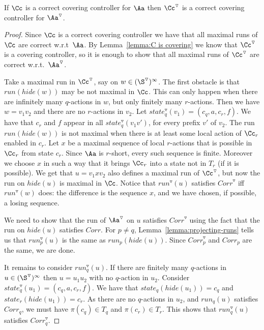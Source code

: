 \documentclass[10pt,a4paper]{article}
\newcommand{\run}{\mathit{run}}
\newcommand{\Cor}{\mathit{Corr}}
\newcommand{\hide}{\mathit{hide}}
\newcommand{\red}[1]{#1^\triangledown}
\newcommand{\state}{\mathit{state}}
\begin{document}
\begin{lemma}\label{lemma:C correct}
  If $\Cc$ is a correct covering controller for $\Aa$ then $\red\Cc$
  is a correct covering controller for $\red\Aa$.
\end{lemma}
\begin{proof}
  Since $\Cc$ is a correct covering controller we have that
  all maximal runs of $\Cc$ are correct w.r.t~$\Aa$.  By
  Lemma~\ref{lemma:C is covering} we 
  know that $\red \Cc$ is a covering controller,
  so it is enough to show that all maximal runs of $\red\Cc$ are
  correct w.r.t.~$\red\Aa$.

  Take a maximal run in $\red\Cc$, say on $w\in (\red\S)^\infty$. The
  first obstacle is that $\run(\hide(w))$ may be not maximal in
  $\Cc$. This can only happen when there are infinitely many
  $q$-actions in $w$, but only finitely many $r$-actions. Then we have
  $w=v_1v_2$ and there are no $r$-actions in $v_2$. Let
  $\red\state_q(v_1)=(c_q,a,c_r,f)$. We have that $c_r$ and $f$ appear
  in all $\red\state_q(v_1v')$, for every prefix $v'$ of $v_2$. The
  run $\run(\hide(w))$ is not maximal when there is at least some
  local action of $\Cc_r$ enabled in $c_r$. Let $x$ be a maximal
  sequence of local $r$-actions that is possible in $\Cc_r$ from state
  $c_r$. Since $\Aa$ is $r$-short, every such sequence is
  finite. Moreover we choose $x$ in such a way that it brings $\Cc_r$
  into a state not in $T_r$ (if it is possible).  We get that
  $u=v_1xv_2$ also defines a maximal run of $\red\Cc$, but now the run
  on $\hide(u)$ is maximal in $\Cc$. Notice that $\red\run(u)$
  satisfies $\red\Cor$ iff $\red\run(w)$ does: the difference is the
  sequence $x$, and we have chosen, if possible, a losing sequence.

  We need to show that the run of $\red\Aa$ on $u$ satisfies
  $\red\Cor$ using the fact that the run on $\hide(u)$ satisfies
  $\Cor$.  For $p\not=q$, Lemma~\ref{lemma:projecting-runs} tells us
  that $\red\run_p(u)$ is the same as $\run_p(\hide(u))$. Since
  $\red\Cor_p$ and $\Cor_p$ are the same, we are done.

  It remains to consider $\red\run_q(u)$. If there are finitely many
  $q$-actions  in $u \in (\red\S)^\infty$ then  $u=u_1u_2$ with no
  $q$-action in $u_2$. Consider
  $\red\state_q(u_1)=(c_q,a,c_r,f)$. We have that
  $\state_q(\hide(u_1))=c_q$ and $\state_r(\hide(u_1))=c_r$. As there
  are no $q$-actions in $u_2$, and $\run_q(u)$ satisfies
  $\Cor_q$, we must have $\pi(c_q)\in T_q$ and $\pi(c_r)\in T_r$. This shows that
  $\red\run_q(u)$ satisfies $\red\Cor_q$.


\end{proof}
\end{document}

